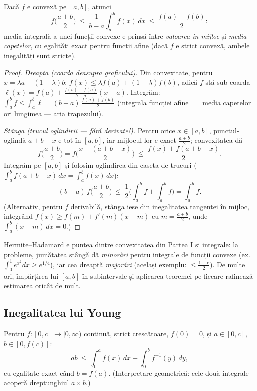 \begin{teorema}
Dacă $f$ e convexă pe $[a,b]$, atunci
\[
f\Big(\frac{a+b}{2}\Big)\ \le\ \frac{1}{b-a}\int_a^b f(x)\,dx\ \le\ \frac{f(a)+f(b)}{2}:
\]
media integrală a unei funcții convexe e prinsă între \emph{valoarea în mijloc} și \emph{media capetelor}, cu egalități exact pentru funcții afine (dacă $f$ e strict convexă, ambele inegalități sunt stricte).
\end{teorema}
\begin{proof}
\emph{Dreapta (coarda deasupra graficului).} Din convexitate, pentru $x=\lambda a+(1-\lambda)b$:
$f(x)\le\lambda f(a)+(1-\lambda)f(b)$, adică $f$ stă sub coarda $\ell(x)=f(a)+\frac{f(b)-f(a)}{b-a}(x-a)$. Integrăm: $\int_a^b f\le\int_a^b\ell=(b-a)\,\frac{f(a)+f(b)}{2}$ (integrala funcției afine $=$ media capetelor ori lungimea --- aria trapezului).

\emph{Stânga (trucul oglindirii --- fără derivate!).} Pentru orice $x\in[a,b]$, punctul-oglindă $a+b-x$ e tot în $[a,b]$, iar mijlocul lor e exact $\frac{a+b}{2}$; convexitatea dă
\[
f\Big(\frac{a+b}{2}\Big)=f\Big(\frac{x+(a+b-x)}{2}\Big)\ \le\ \frac{f(x)+f(a+b-x)}{2}.
\]
Integrăm pe $[a,b]$ și folosim oglindirea din caseta de trucuri ($\int_a^b f(a+b-x)\,dx=\int_a^b f(x)\,dx$):
\[
(b-a)\,f\Big(\frac{a+b}{2}\Big)\ \le\ \frac12\Big(\int_a^b f+\int_a^b f\Big)=\int_a^b f.
\]
(Alternativ, pentru $f$ derivabilă, stânga iese din inegalitatea tangentei în mijloc, integrând $f(x)\ge f(m)+f'(m)(x-m)$ cu $m=\frac{a+b}2$, unde $\int_a^b(x-m)\,dx=0$.)
\end{proof}

\begin{obs}
Hermite--Hadamard e puntea dintre convexitatea din Partea I și integrale: la probleme, jumătatea stângă dă \emph{minorări} pentru integrale de funcții convexe (ex.\ $\int_0^1 e^{x^2}dx\ge e^{1/4}$), iar cea dreaptă \emph{majorări} (același exemplu: $\le\frac{1+e}{2}$). De multe ori, împărțirea lui $[a,b]$ în subintervale și aplicarea teoremei pe fiecare rafinează estimarea oricât de mult.
\end{obs}

\subsection{Inegalitatea lui Young}

\begin{teorema}[Young]
Pentru $f:[0,c]\to[0,\infty)$ continuă, strict crescătoare, $f(0)=0$, și $a\in[0,c]$, $b\in[0,f(c)]$:
\[
ab\ \le\ \int_0^a f(x)\,dx+\int_0^b f^{-1}(y)\,dy,
\]
cu egalitate exact când $b=f(a)$. (Interpretare geometrică: cele două integrale acoperă dreptunghiul $a\times b$.)
\end{teorema}

